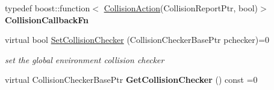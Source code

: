 \label{classOpenRAVE_1_1EnvironmentBase_env_collision_checking}
\hypertarget{classOpenRAVE_1_1EnvironmentBase_env_collision_checking}{}
 \begin{DoxyCompactItemize}
\item 
\hypertarget{classOpenRAVE_1_1EnvironmentBase_a28e410489b8d769bfc03a29283beff59}{
typedef boost::function$<$ \hyperlink{namespaceOpenRAVE_aec38ff628d76ac03cb4ac5d8f5cf3664}{CollisionAction}(CollisionReportPtr, bool)$>$ {\bfseries CollisionCallbackFn}}
\label{classOpenRAVE_1_1EnvironmentBase_a28e410489b8d769bfc03a29283beff59}

\item 
\hypertarget{classOpenRAVE_1_1EnvironmentBase_a834baeb37724a8ec7c646f4dcb8068c4}{
virtual bool \hyperlink{classOpenRAVE_1_1EnvironmentBase_a834baeb37724a8ec7c646f4dcb8068c4}{SetCollisionChecker} (CollisionCheckerBasePtr pchecker)=0}
\label{classOpenRAVE_1_1EnvironmentBase_a834baeb37724a8ec7c646f4dcb8068c4}

\begin{DoxyCompactList}\small\item\em set the global environment collision checker \item\end{DoxyCompactList}\item 
\hypertarget{classOpenRAVE_1_1EnvironmentBase_a5ab1aa7fd5f2eb4b54dfac009c1e2804}{
virtual CollisionCheckerBasePtr {\bfseries GetCollisionChecker} () const =0}
\label{classOpenRAVE_1_1EnvironmentBase_a5ab1aa7fd5f2eb4b54dfac009c1e2804}


\end{DoxyCompactItemize}
